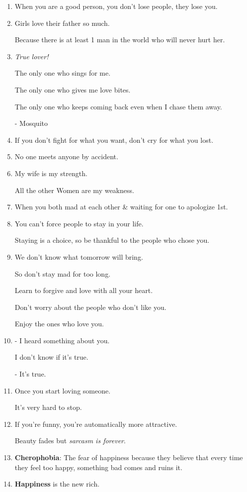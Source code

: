 \documentclass{article}
\numberwithin{equation}{section}
\begin{document}
\begin{enumerate}
    Living Isn't Fucking Easy.
    \item When you are a good person, you don't lose people, they lose you.
    \item Girls love their father so much.
    
    Because there is at least 1 man in the world who will never hurt her.
    \item \textit{True lover!}
    
    The only one who sings for me.
    
    The only one who gives me love bites.
    
    The only one who keeps coming back even when I chase them away.
    
    - Mosquito
    \item If you don't fight for what you want, don't cry for what you lost.
    \item No one meets anyone by accident.
    \item My wife is my strength.
    
    All the other Women are my weakness.
    \item When you both mad at each other \& waiting for one to apologize 1st.
    \item You can't force people to stay in your life.
    
    Staying is a choice, so be thankful to the people who chose you.
    \item We don't know what tomorrow will bring.
    
    So don't stay mad for too long.
    
    Learn to forgive and love with all your heart.
    
    Don't worry about the people who don't like you.
    
    Enjoy the ones who love you.
    \item - I heard something about you.
    
    I don't know if it's true.
    
    - It's true.
    \item Once you start loving someone.
    
    It's very hard to stop.
    \item If you're funny, you're automatically more attractive.
    
    Beauty fades but \textit{sarcasm is forever}.
    \item \textbf{Cherophobia}: The fear of happiness because they believe that every time they feel too happy, something bad comes and ruins it.
    \item \textbf{Happiness} is the new rich.
    

\end{enumerate}
\end{document}

